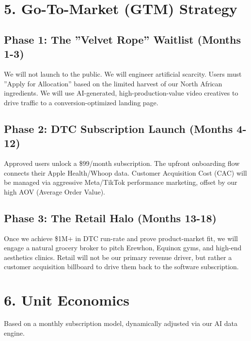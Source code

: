 \documentclass[11pt,a4paper]{article}
\begin{document}
\section{5. Go-To-Market (GTM) Strategy}
\subsection{Phase 1: The ''Velvet Rope'' Waitlist (Months 1-3)}
We will not launch to the public. We will engineer artificial scarcity. Users must ''Apply for Allocation'' based on the limited harvest of our North African ingredients. We will use AI-generated, high-production-value video creatives to drive traffic to a conversion-optimized landing page.

\subsection{Phase 2: DTC Subscription Launch (Months 4-12)}
Approved users unlock a \$99/month subscription. The upfront onboarding flow connects their Apple Health/Whoop data. Customer Acquisition Cost (CAC) will be managed via aggressive Meta/TikTok performance marketing, offset by our high AOV (Average Order Value).

\subsection{Phase 3: The Retail Halo (Months 13-18)}
Once we achieve \$1M+ in DTC run-rate and prove product-market fit, we will engage a natural grocery broker to pitch Erewhon, Equinox gyms, and high-end aesthetics clinics. Retail will not be our primary revenue driver, but rather a customer acquisition billboard to drive them back to the software subscription.

\section{6. Unit Economics}
Based on a monthly subscription model, dynamically adjusted via our AI data engine.
\end{document}
